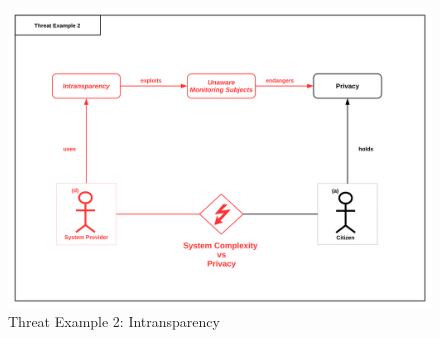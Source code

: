 \begin{figure}
\centering
\includegraphics[width=\textwidth]{diagrams/png/intransparency.png}


\caption{Threat Example 2: Intransparency}
\label{figure:Threat Example 2: Intransparency}
\end{figure}
